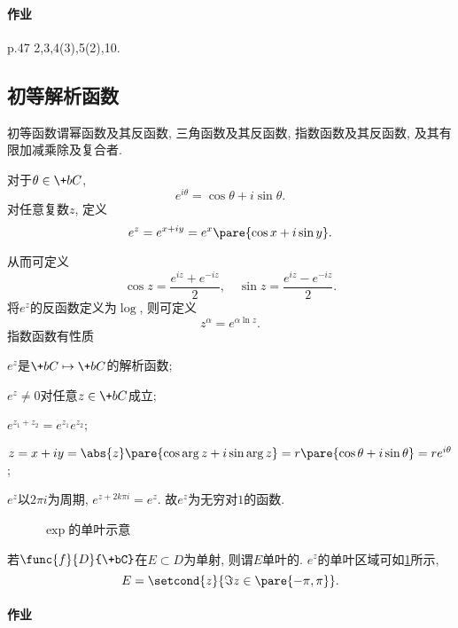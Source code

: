 \documentclass{ctexart}
\begin{document}
\paragraph{作业} %
\label{par:作业}

p.47 2,3,4(3),5(2),10.



\subsection{初等解析函数} %
\label{sub:初等解析函数}

初等函数谓幂函数及其反函数, 三角函数及其反函数, 指数函数及其反函数, 及其有限加减乘除及复合者.
\begin{finale}
    \begin{definition}[Euler公式]
        对于$\theta\in\+bC$,
        \[ e^{i\theta} = \cos\theta + i\sin\theta. \]
        对任意复数$z$, 定义
        \[ e^z = e^{x+iy} = e^x\pare{\cos x + i\sin y}. \]
    \end{definition}
\end{finale}
从而可定义
\[ \cos z = \frac{e^{iz} + e^{-iz}}{2},\quad \sin z = \frac{e^{iz} - e^{-iz}}{2}.  \]
将$e^z$的反函数定义为$\log$, 则可定义
\[ z^\alpha = e^{\alpha\ln z}. \]
指数函数有性质
\begin{cenum}
    \item $e^z$是$\+bC\mapsto \+bC$的解析函数;
    \item $e^z\neq 0$对任意$z\in\+bC$成立;
    \item $e^{z_1+z_2} = e^{z_1}e^{z_2}$;
    \item $z = x+iy = \abs{z}\pare{\cos\arg z + i\sin\arg z} = r\pare{\cos\theta + i\sin \theta} = re^{i\theta}$;
    \item $e^z$以$2\pi i$为周期, $e^{z+2k\pi i} = e^z$. 故$e^z$为无穷对$1$的函数.
\end{cenum}
\begin{figure}[ht]
    \centering
    \caption{$\exp$的单叶示意}
    \label{fig:exp的单叶示意}
\end{figure}
若$\func{f}{D}{\+bC}$在$E\subset D$为单射, 则谓$E$单叶的. $e^z$的单叶区域可如\cref{fig:exp的单叶示意}所示,
\[ E = \setcond{z}{\Im z \in \pare{-\pi,\pi}}. \]

\paragraph{作业} %
\label{par:作业}
\end{document}
